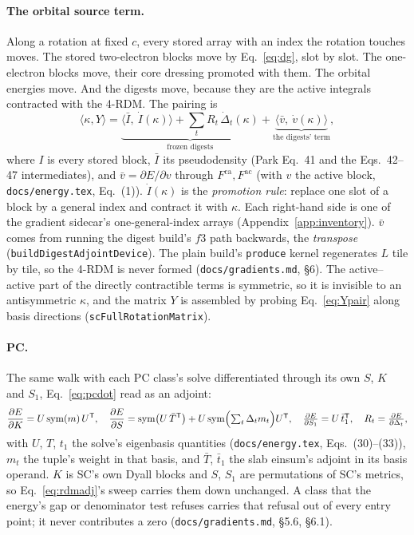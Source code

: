 \documentclass[11pt]{article}
\newcommand{\code}[1]{\texttt{#1}}
\newcommand{\Fca}{F^{\mathrm{ca}}}
\newcommand{\Fac}{F^{\mathrm{ac}}}
\begin{document}
\paragraph{The orbital source term.} Along a rotation at fixed $c$, every
stored array with an index the rotation touches moves. The stored two-electron
blocks move by Eq.~\eqref{eq:dg}, slot by slot. The one-electron blocks move,
their core dressing promoted with them. The orbital energies move. And the
digests move, because they are the active integrals contracted with the
4-RDM. The pairing is
\begin{equation}
  \langle\kappa, Y\rangle =
    \underbrace{\langle \bar I,\ \dot I(\kappa)\rangle
    + \sum_t R_t\,\dot\Delta_t(\kappa)}_{\text{frozen digests}}
    + \underbrace{\langle \bar v,\ \dot v(\kappa)\rangle}_{\text{the digests' term}},
  \label{eq:Ypair}
\end{equation}
where $I$ is every stored block, $\bar I$ its pseudodensity (Park Eq.~41 and
the Eqs.~42--47 intermediates), and $\bar v = \partial E/\partial v$ through
$\Fca,\Fac$ (with $v$ the active block, \code{docs/energy.tex},
Eq.~(1)). $\dot I(\kappa)$ is the \emph{promotion rule}: replace one slot of a
block by a general index and contract it with $\kappa$. Each right-hand side is
one of the gradient sidecar's one-general-index arrays
(Appendix~\ref{app:inventory}). $\bar v$ comes from running the digest build's
$f3$ path backwards, the \emph{transpose} (\code{buildDigestAdjointDevice}).
The plain build's \code{produce} kernel regenerates $L$ tile by tile, so the
4-RDM is never formed (\code{docs/gradients.md}, \S6). The active--active part
of the directly contractible terms is symmetric, so it is invisible to an
antisymmetric $\kappa$, and the matrix $Y$ is assembled by probing
Eq.~\eqref{eq:Ypair} along basis directions (\code{scFullRotationMatrix}).

\paragraph{PC.} The same walk with each PC class's solve differentiated
through its own $S$, $K$ and $S_1$, Eq.~\eqref{eq:pcdot} read as an adjoint:
\begin{equation}
  \frac{\partial E}{\partial K} = U\,\mathrm{sym}(m)\,U^{\mathsf T},\quad
  \frac{\partial E}{\partial S} = \mathrm{sym}\bigl(U\,\bar T^{\mathsf T}\bigr)
     + U\,\mathrm{sym}\Bigl(\textstyle\sum_t \Delta_t m_t\Bigr)U^{\mathsf T},\quad
  \frac{\partial E}{\partial S_1} = U\,\bar t_1^{\mathsf T},\quad
  R_t = \frac{\partial E}{\partial\Delta_t},
  \label{eq:pcadj}
\end{equation}
with $U$, $T$, $t_1$ the solve's eigenbasis quantities (\code{docs/energy.tex},
Eqs.~(30)--(33)), $m_t$ the tuple's weight in that basis, and $\bar T$,
$\bar t_1$ the slab einsum's adjoint in its basis operand. $K$ is SC's own
Dyall blocks and $S$, $S_1$ are permutations of SC's metrics, so
Eq.~\eqref{eq:rdmadj}'s sweep carries them down unchanged. A class that the
energy's gap or denominator test refuses carries that refusal out of every
entry point; it never contributes a zero (\code{docs/gradients.md}, \S5.6,
\S6.1).
\end{document}
